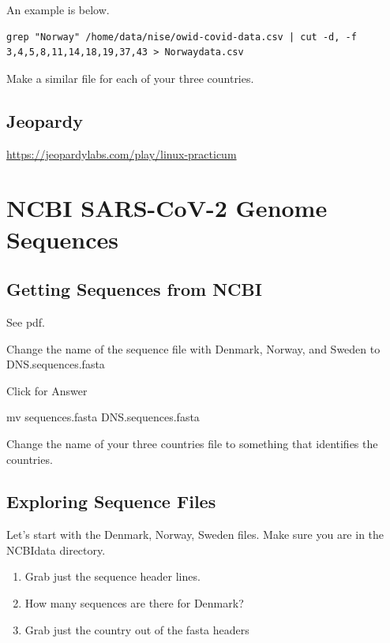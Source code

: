 \documentclass[
]{book}
\begin{document}
An example is below.

\begin{verbatim}
grep "Norway" /home/data/nise/owid-covid-data.csv | cut -d, -f 3,4,5,8,11,14,18,19,37,43 > Norwaydata.csv
\end{verbatim}

Make a similar file for each of your three countries.

\hypertarget{jeopardy-1}{%
\section{Jeopardy}\label{jeopardy-1}}

\url{https://jeopardylabs.com/play/linux-practicum}

\hypertarget{ncbi-sars-cov-2-genome-sequences}{%
\chapter{NCBI SARS-CoV-2 Genome Sequences}\label{ncbi-sars-cov-2-genome-sequences}}

\hypertarget{getting-sequences-from-ncbi}{%
\section{Getting Sequences from NCBI}\label{getting-sequences-from-ncbi}}

See pdf.

Change the name of the sequence file with Denmark, Norway, and Sweden to DNS.sequences.fasta

Click for Answer

mv sequences.fasta DNS.sequences.fasta

\hfill\break

Change the name of your three countries file to something that identifies the countries.

\hypertarget{exploring-sequence-files}{%
\section{Exploring Sequence Files}\label{exploring-sequence-files}}

Let's start with the Denmark, Norway, Sweden files. Make sure you are in the NCBIdata directory.

\begin{enumerate}
\def\labelenumi{\arabic{enumi}.}
\item
  Grab just the sequence header lines.
\item
  How many sequences are there for Denmark?
\item
  Grab just the country out of the fasta headers
\end{enumerate}
\end{document}
